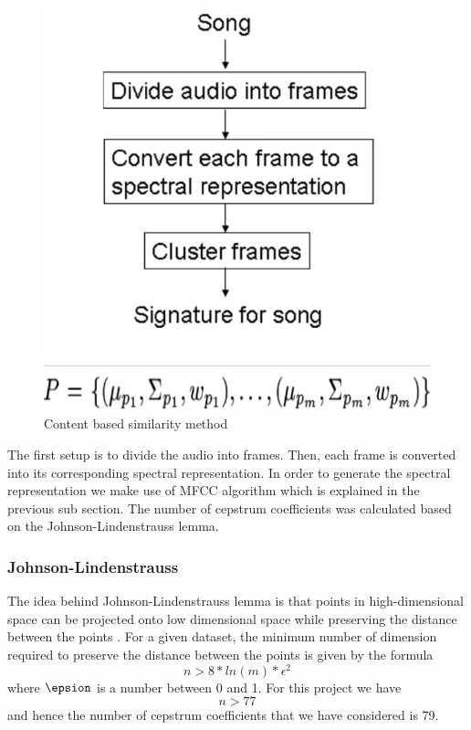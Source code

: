\documentclass[12pt]{article}
\begin{document}
\begin{figure}[h]\label{content}
\center
\includegraphics{fig1.png}
\caption{Content based similarity method}
\end{figure}

The first setup is to divide the audio into frames. Then, each frame is converted into its corresponding spectral representation. In order to generate the spectral representation we make use of MFCC algorithm which is explained in the previous sub section. The number of cepstrum coefficients was calculated based on the Johnson-Lindenstrauss lemma.

\subsubsection{Johnson-Lindenstrauss}
The idea behind Johnson-Lindenstrauss lemma is that points in high-dimensional space can be projected onto low dimensional space while preserving the distance between the points \cite{dasgupta}. For a given dataset, the minimum number of dimension required to preserve the distance between the points is given by the formula $$ n > 8 * ln(m) * \epsilon ^ 2 $$ where $\epsion$ is a number between 0 and 1. For this project we have $$ n > 77$$ and hence the number of cepstrum coefficients that we have considered is 79.
\end{document}
